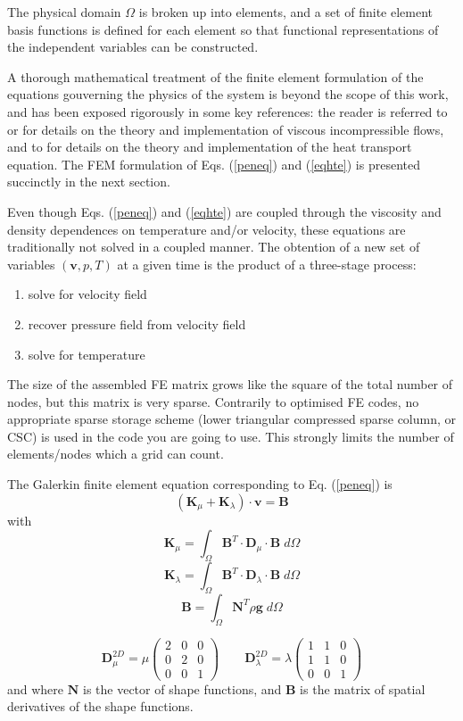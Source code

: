 The physical domain $\Omega$ is broken up into elements, and a set of finite element basis functions is defined for each element so that functional 
representations of the independent variables can be constructed.

A thorough mathematical treatment of the finite element formulation of the equations gouverning the physics of the system is beyond the scope of this 
work, and has been exposed rigorously in some key references: the reader is referred to \cite{dohu03} or \cite{gunz89} for details on the theory and implementation of viscous incompressible flows, and to \cite{lens04} for details on the theory and implementation of the heat transport equation. The FEM formulation of Eqs. (\ref{peneq}) and (\ref{eqhte}) is presented succinctly in the next section.

Even though Eqs. (\ref{peneq}) and (\ref{eqhte}) are coupled through the viscosity and density dependences on temperature and/or velocity, these equations are traditionally not solved in a coupled manner. The obtention of a new set of variables $({\bm v},p,T)$ at a given time is the product of a three-stage process:
\begin{enumerate}
\item solve for velocity field
\item recover pressure field from velocity field 
\item solve for temperature
\end{enumerate}

The size of the assembled FE matrix grows like the square of the total number of nodes, but this matrix is very sparse. Contrarily to 
optimised FE codes, no appropriate sparse storage scheme (lower triangular compressed sparse column, or CSC) is used in the code
you are going to use. This 
strongly limits the number of elements/nodes which a grid can count.


The Galerkin finite element equation corresponding to Eq. (\ref{peneq}) is 
\[
( {\bm K}_\mu + {\bm K}_\lambda)\cdot {\bm v} = {\bm B}
\]
with
\[
{\bm K}_\mu =\int_\Omega {\bm B}^T \cdot {\bm D}_{\mu } \cdot {\bm B} \; d\Omega
\]
\[
{\bm K}_\lambda =\int_\Omega {\bm B}^T \cdot {\bm D}_{\lambda} \cdot {\bm B} \; d\Omega
\]
\[
{\bm B}=\int_\Omega {\bm N}^T \rho {\bm g} \; d\Omega
\]

\[
{\bm D}_\mu^{2D} = \mu 
\left(
\begin{array}{ccc}
2& 0& 0 \\ 
0& 2& 0 \\
0& 0& 1 
\end{array}
\right)
\quad\quad
{\bm D}_\lambda^{2D} = 
\lambda 
\left(
\begin{array}{ccc}
1 & 1& 0\\
1 & 1& 0\\
0 & 0& 1
\end{array}
\right)
\]
and where ${\bm N}$ is the vector of shape functions, and ${\bm B}$ is the matrix of spatial derivatives of the shape functions. 


